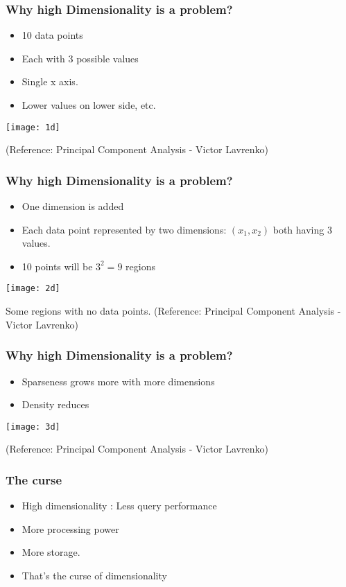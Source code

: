 \begin{frame}[fragile]\frametitle{Why high Dimensionality is a problem? }
	\begin{itemize}
	\item 10 data points
	\item Each with 3 possible values
	\item Single x axis. 
	\item Lower values on lower side, etc.
	\end{itemize}
\begin{center}
\texttt{[image: 1d]}
\end{center}
\tiny{(Reference: Principal Component Analysis - Victor Lavrenko)}
\end{frame}

\begin{frame}[fragile]\frametitle{Why high Dimensionality is a problem? }
	\begin{itemize}
	\item One dimension is added 
	\item Each data point represented by two dimensions: $(x_1, x_2)$ both having 3 values.
	\item 10 points will be $3^2 = 9$ regions
	\end{itemize}
\begin{center}
\texttt{[image: 2d]}
\end{center}	
Some regions with no data points. 
\tiny{(Reference: Principal Component Analysis - Victor Lavrenko)}
\end{frame}

\begin{frame}[fragile]\frametitle{Why high Dimensionality is a problem? }
	\begin{itemize}
	\item Sparseness grows more with more dimensions
	\item Density reduces
	\end{itemize}
\begin{center}
\texttt{[image: 3d]}
\end{center}	
\tiny{(Reference: Principal Component Analysis - Victor Lavrenko)}
\end{frame}

\begin{frame}[fragile]\frametitle{The curse}
	\begin{itemize}
	\item High dimensionality : Less query performance 
	\item More processing power 
	\item More storage.  
	\item That's the curse of dimensionality
	\end{itemize}
\end{frame}

